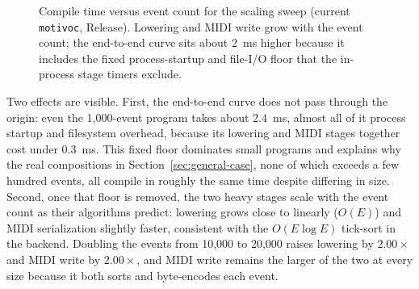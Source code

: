\begin{figure}[htbp]
  \centering
  \caption{Compile time versus event count for the scaling sweep (current \texttt{motivoc}, Release).
    Lowering and MIDI write grow with the event count; the end-to-end curve sits about $2$~ms higher because it includes
  the fixed process-startup and file-I/O floor that the in-process stage timers exclude.}\label{fig:scaling-sweep}
\end{figure}

Two effects are visible.
First, the end-to-end curve does not pass through the origin: even the 1{,}000-event program takes about $2.4$~ms,
almost all of it process startup and filesystem overhead, because its lowering and MIDI stages together cost under
$0.3$~ms.
This fixed floor dominates small programs and explains why the real compositions in Section~\ref{sec:general-case}, none
of which exceeds a few hundred events, all compile in roughly the same time despite differing in size.
Second, once that floor is removed, the two heavy stages scale with the event count as their algorithms predict:
lowering grows close to linearly ($O(E)$) and MIDI serialization slightly faster, consistent with the $O(E \log E)$
tick-sort in the backend.
Doubling the events from 10{,}000 to 20{,}000 raises lowering by $2.00\times$ and MIDI write by $2.00\times$, and MIDI
write remains the larger of the two at every size because it both sorts and byte-encodes each event.

